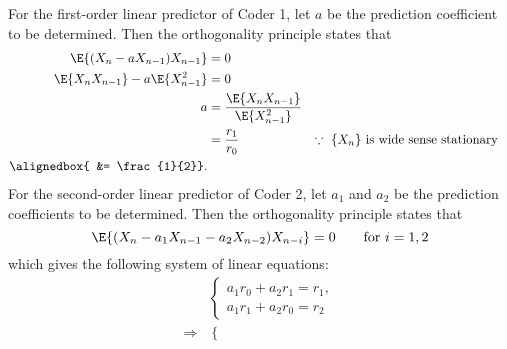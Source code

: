 \documentclass[
  coursecode={MTHE 477},
  assignmentname={Homework \homeworknumber},
  studentnumber=20053722,
  name={Bryan Hoang},
  draft,
]{
  ltxanswer%
}
\begin{document}
  \begin{questions}
    \setcounter{question}{\questionnumber}
    \addtocounter{question}{-1}
    \question[25]\
    \begin{parts}
      \part{}
      \begin{solution}
        For the first-order linear predictor of Coder 1, let \(a\) be the prediction coefficient to be determined. Then the orthogonality principle states that
        \begin{align*}
          \E{(X_{n} - a X_{n - 1}) X_{n - 1}}       &= 0                                                                                                         \\
          \E{X_{n} X_{n - 1}} - a \E{X_{n - 1}^{2}} &= 0                                                                                                         \\
          a                                         &= \frac{\E{X_{n} X_{n - 1}}}{\E{X_{n - 1}^{2}}}                                                             \\
                                                    &= \frac{r_{1}}{r_{0}}                           & &\text{\(\because\ \{X_{n}\}\)  is wide sense stationary} \\
          \alignedbox{                              &= \frac{1}{2}}.
        \end{align*}
        For the second-order linear predictor of Coder 2, let \(a_{1}\) and \(a_{2}\) be the prediction coefficients to be determined. Then the orthogonality principle states that
        \begin{equation*}
          \E{(X_{n} - a_{1} X_{n - 1} - a_{2} X_{n - 2}) X_{n - i}} = 0 \qquad \text{for \(i = 1, 2\)}
        \end{equation*}
        which gives the following system of linear equations:
        \begin{align*}
                                   &\begin{cases}
                                      a_{1} r_{0} + a_{2} r_{1} = r_{1}, \\
                                      a_{1} r_{1} + a_{2} r_{0} = r_{2}
                                    \end{cases} \\
          \Rightarrow              &\begin{cases}

\end{cases}
\end{align*}
\end{solution}
\end{parts}
\end{questions}
\end{document}
